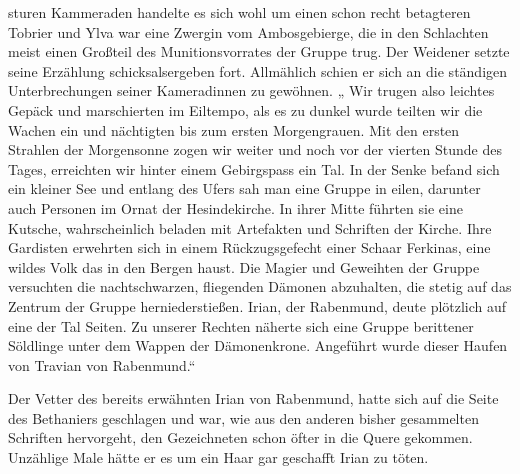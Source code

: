 sturen Kammeraden handelte es sich wohl um einen schon recht betagteren Tobrier und Ylva war eine Zwergin vom Ambosgebierge, die in den Schlachten meist einen Großteil des Munitionsvorrates der Gruppe trug. Der Weidener setzte seine Erzählung schicksalsergeben fort. Allmählich schien er sich an die ständigen Unterbrechungen seiner Kameradinnen zu gewöhnen. „ Wir trugen also leichtes Gepäck und marschierten im Eiltempo, als es zu dunkel wurde teilten wir die Wachen ein und nächtigten bis zum ersten Morgengrauen. Mit den ersten Strahlen der Morgensonne zogen wir weiter und noch vor der vierten Stunde des Tages, erreichten wir hinter einem Gebirgspass ein Tal. In der Senke befand sich ein kleiner See und entlang des Ufers sah man eine Gruppe in eilen, darunter auch Personen im Ornat der Hesindekirche. In ihrer Mitte führten sie eine Kutsche, wahrscheinlich beladen mit Artefakten und Schriften der Kirche. Ihre Gardisten erwehrten sich in einem Rückzugsgefecht einer Schaar Ferkinas, eine wildes Volk das in den Bergen haust. Die Magier und Geweihten der Gruppe versuchten die nachtschwarzen, fliegenden Dämonen abzuhalten, die stetig auf das Zentrum der Gruppe herniederstießen. Irian, der Rabenmund, deute plötzlich auf eine der Tal Seiten. Zu unserer Rechten näherte sich eine Gruppe berittener Söldlinge unter dem Wappen der Dämonenkrone. Angeführt wurde dieser Haufen von Travian von Rabenmund.“

Der Vetter des bereits erwähnten Irian von Rabenmund, hatte sich auf die Seite des Bethaniers geschlagen und war, wie aus den anderen bisher gesammelten Schriften hervorgeht, den Gezeichneten schon öfter in die Quere gekommen. Unzählige Male hätte er es um ein Haar gar geschafft Irian zu töten.

